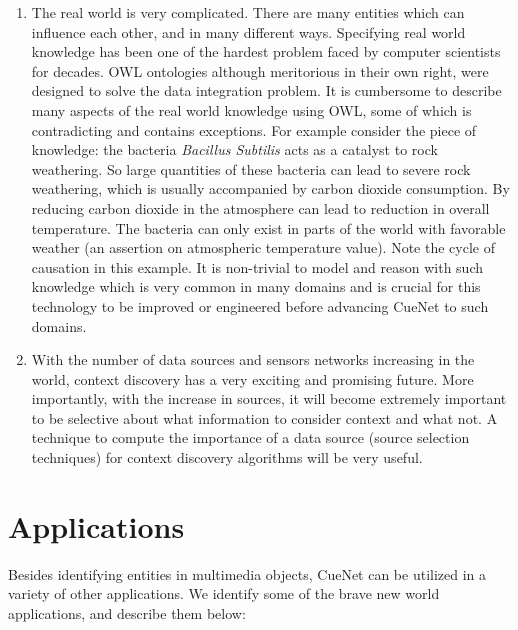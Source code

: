 \begin{enumerate}
\item The real world is very complicated. There are many entities which can influence each other, and in many different ways. Specifying real world knowledge has been one of the hardest problem faced by computer scientists for decades. OWL ontologies although meritorious in their own right, were designed to solve the data integration problem. It is cumbersome to describe many aspects of the real world knowledge using OWL, some of which is contradicting and contains exceptions. For example consider the piece of knowledge: the bacteria \textit{Bacillus Subtilis} acts as a catalyst to rock weathering. So large quantities of these bacteria can lead to severe rock weathering, which is usually accompanied by carbon dioxide consumption. By reducing carbon dioxide in the atmosphere can lead to reduction in overall temperature. The bacteria can only exist in parts of the world with favorable weather (an assertion on atmospheric temperature value). Note the cycle of causation in this example. It is non-trivial to model and reason with such knowledge which is very common in many domains and is crucial for this technology to be improved or engineered before advancing CueNet to such domains.

\item With the number of data sources and sensors networks increasing in the world, context discovery has a very exciting and promising future. More importantly, with the increase in sources, it will become extremely important to be selective about what information to consider context and what not. A technique to compute the importance of a data source (source selection techniques) for context discovery algorithms will be very useful.

\end{enumerate}

\section{Applications}
Besides identifying entities in multimedia objects, CueNet can be utilized in a variety of other applications. We identify some of the brave new world applications, and describe them below:

